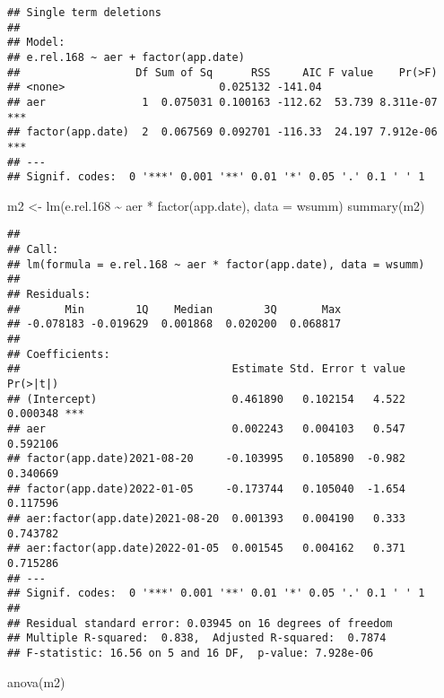 \documentclass[
]{article}
\newenvironment{Shaded}{\begin{snugshade}}{\end{snugshade}}
\newcommand{\AttributeTok}[1]{\textcolor[rgb]{0.77,0.63,0.00}{#1}}
\newcommand{\FloatTok}[1]{\textcolor[rgb]{0.00,0.00,0.81}{#1}}
\newcommand{\FunctionTok}[1]{\textcolor[rgb]{0.00,0.00,0.00}{#1}}
\newcommand{\NormalTok}[1]{#1}
\newcommand{\OtherTok}[1]{\textcolor[rgb]{0.56,0.35,0.01}{#1}}
\newcommand{\SpecialCharTok}[1]{\textcolor[rgb]{0.00,0.00,0.00}{#1}}
\begin{document}
\begin{verbatim}
## Single term deletions
## 
## Model:
## e.rel.168 ~ aer + factor(app.date)
##                  Df Sum of Sq      RSS     AIC F value    Pr(>F)    
## <none>                        0.025132 -141.04                      
## aer               1  0.075031 0.100163 -112.62  53.739 8.311e-07 ***
## factor(app.date)  2  0.067569 0.092701 -116.33  24.197 7.912e-06 ***
## ---
## Signif. codes:  0 '***' 0.001 '**' 0.01 '*' 0.05 '.' 0.1 ' ' 1
\end{verbatim}

\begin{Shaded}
\begin{Highlighting}[]
\NormalTok{m2 }\OtherTok{\textless{}{-}} \FunctionTok{lm}\NormalTok{(e.rel}\FloatTok{.168} \SpecialCharTok{\textasciitilde{}}\NormalTok{ aer }\SpecialCharTok{*} \FunctionTok{factor}\NormalTok{(app.date), }\AttributeTok{data =}\NormalTok{ wsumm)}
\FunctionTok{summary}\NormalTok{(m2)}
\end{Highlighting}
\end{Shaded}

\begin{verbatim}
## 
## Call:
## lm(formula = e.rel.168 ~ aer * factor(app.date), data = wsumm)
## 
## Residuals:
##       Min        1Q    Median        3Q       Max 
## -0.078183 -0.019629  0.001868  0.020200  0.068817 
## 
## Coefficients:
##                                 Estimate Std. Error t value Pr(>|t|)    
## (Intercept)                     0.461890   0.102154   4.522 0.000348 ***
## aer                             0.002243   0.004103   0.547 0.592106    
## factor(app.date)2021-08-20     -0.103995   0.105890  -0.982 0.340669    
## factor(app.date)2022-01-05     -0.173744   0.105040  -1.654 0.117596    
## aer:factor(app.date)2021-08-20  0.001393   0.004190   0.333 0.743782    
## aer:factor(app.date)2022-01-05  0.001545   0.004162   0.371 0.715286    
## ---
## Signif. codes:  0 '***' 0.001 '**' 0.01 '*' 0.05 '.' 0.1 ' ' 1
## 
## Residual standard error: 0.03945 on 16 degrees of freedom
## Multiple R-squared:  0.838,  Adjusted R-squared:  0.7874 
## F-statistic: 16.56 on 5 and 16 DF,  p-value: 7.928e-06
\end{verbatim}

\begin{Shaded}
\begin{Highlighting}[]
\FunctionTok{anova}\NormalTok{(m2)}
\end{Highlighting}
\end{Shaded}
\end{document}
